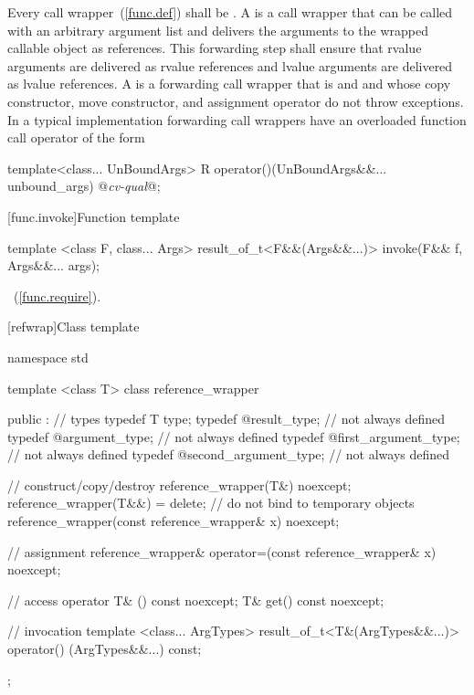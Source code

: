 \pnum
{}%
%
%
%
%
Every call wrapper~(\ref{func.def}) shall be
.
A  is a
call wrapper that can be called with an arbitrary argument list
and delivers the arguments to the wrapped callable object as references.
This forwarding step shall ensure that rvalue arguments are delivered as rvalue references
and lvalue arguments are delivered as lvalue references.
A  is a forwarding call wrapper that is
 and  and
whose copy constructor, move constructor, and assignment operator
do not throw exceptions.
\enternote In a typical implementation
forwarding call wrappers have an overloaded function call
operator of
the form

\begin{codeblock}
template<class... UnBoundArgs>
R operator()(UnBoundArgs&&... unbound_args) @\textit{cv-qual}@;
\end{codeblock}
\exitnote

[func.invoke]{Function template }
%
%
\begin{itemdecl}
template <class F, class... Args>
  result_of_t<F&&(Args&&...)> invoke(F&& f, Args&&... args);
\end{itemdecl}

\begin{itemdescr}
\pnum
\returns
{}~(\ref{func.require}).
\end{itemdescr}

[refwrap]{Class template }

%
%
%
%
\begin{codeblock}
namespace std {
  template <class T> class reference_wrapper {
  public :
    // types
    typedef T type;
    typedef @\seebelow@ result_type;               // not always defined
    typedef @\seebelow@ argument_type;             // not always defined
    typedef @\seebelow@ first_argument_type;       // not always defined
    typedef @\seebelow@ second_argument_type;      // not always defined

    // construct/copy/destroy
    reference_wrapper(T&) noexcept;
    reference_wrapper(T&&) = delete;     // do not bind to temporary objects
    reference_wrapper(const reference_wrapper& x) noexcept;

    // assignment
    reference_wrapper& operator=(const reference_wrapper& x) noexcept;

    // access
    operator T& () const noexcept;
    T& get() const noexcept;

    // invocation
    template <class... ArgTypes>
    result_of_t<T&(ArgTypes&&...)>
    operator() (ArgTypes&&...) const;
  };
}
\end{codeblock}

